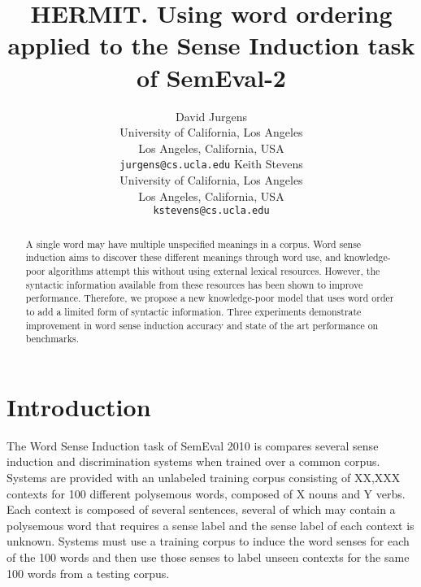 \documentclass[11pt]{article}
\begin{document}
\author{David Jurgens\\
  University of California, Los Angeles\\
  Los Angeles, California, USA\\
  {\tt jurgens@cs.ucla.edu} \And
  Keith Stevens \\
  University of California, Los Angeles\\
  Los Angeles, California, USA\\
  {\tt kstevens@cs.ucla.edu}}

\title{
  HERMIT. Using word ordering applied to the Sense Induction task of SemEval-2}

\date{}

\maketitle

\begin{abstract}
A single word may have multiple unspecified meanings in a corpus.  Word sense
induction aims to discover these different meanings through word use, and
knowledge-poor algorithms attempt this without using external lexical resources.
However, the syntactic information available from these resources has been shown
to improve performance.  Therefore, we propose a new knowledge-poor model that
uses word order to add a limited form of syntactic information. Three
experiments demonstrate improvement in word sense induction accuracy and state
of the art performance on benchmarks.

\end{abstract}
  
\section{Introduction}

The Word Sense Induction task of SemEval 2010 is compares several sense
induction and discrimination systems when trained over a common corpus.  Systems
are provided with an unlabeled training corpus consisting of XX,XXX contexts for
100 different polysemous words, composed of X nouns and Y verbs.  Each context
is composed of several sentences, several of which may contain a polysemous word
that requires a sense label and the sense label of each context is unknown.
Systems must use a training corpus to induce the word senses for each of the 100
words and then use those senses to label unseen contexts for the same 100 words
from a testing corpus.
\end{document}
